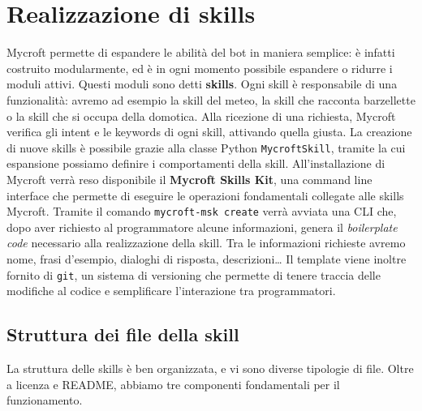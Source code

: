 \chapter{Realizzazione di skills}
\label{chap:skills}
Mycroft permette di espandere le abilità del bot in maniera semplice: è infatti costruito modularmente, ed è in ogni momento possibile espandere o ridurre i moduli attivi.
Questi moduli sono detti \textbf{skills}. Ogni skill è responsabile di una funzionalità: avremo ad esempio la skill del meteo, la skill che racconta barzellette o la skill che si occupa della domotica. Alla ricezione di una richiesta, Mycroft verifica gli intent e le keywords di ogni skill, attivando quella giusta.
La creazione di nuove skills è possibile grazie alla classe Python \texttt{MycroftSkill}, tramite la cui espansione possiamo definire i comportamenti della skill. All'installazione di Mycroft verrà reso disponibile il \textbf{Mycroft Skills Kit}, una command line interface che permette di eseguire le operazioni fondamentali collegate alle skills Mycroft. Tramite il comando \texttt{mycroft-msk create} verrà avviata una CLI che, dopo aver richiesto al programmatore alcune informazioni, genera il \textit{boilerplate code} necessario alla realizzazione della skill. Tra le informazioni richieste avremo nome, frasi d'esempio, dialoghi di risposta, descrizioni\dots
Il template viene inoltre fornito di \texttt{git}, un sistema di versioning che permette di tenere traccia delle modifiche al codice e semplificare l'interazione tra programmatori.
\section{Struttura dei file della skill}
La struttura delle skills è ben organizzata, e vi sono diverse tipologie di file. Oltre a licenza e README, abbiamo tre componenti fondamentali per il funzionamento.
